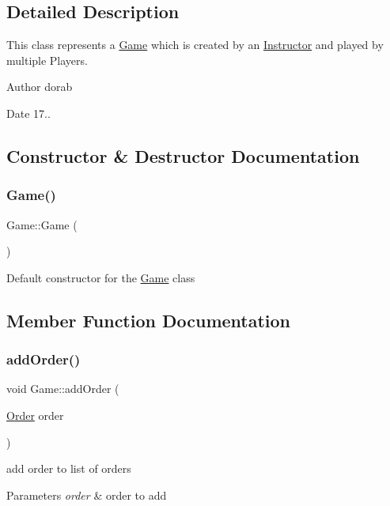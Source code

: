 \subsection{Detailed Description}
This class represents a \hyperlink{classGame}{Game} which is created by an \hyperlink{classInstructor}{Instructor} and played by multiple Players.

\begin{DoxyAuthor}{Author}
dorab 
\end{DoxyAuthor}
\begin{DoxyDate}{Date}
17.. 
\end{DoxyDate}


\subsection{Constructor \& Destructor Documentation}
\mbox{\label{classGame_ad59df6562a58a614fda24622d3715b65}} 
\subsubsection{\texorpdfstring{Game()}{Game()}}
{\footnotesize\ttfamily Game\+::\+Game (\begin{DoxyParamCaption}{ }\end{DoxyParamCaption})}

Default constructor for the \hyperlink{classGame}{Game} class 

\subsection{Member Function Documentation}
\mbox{\label{classGame_a0e6b1f8c9d598c7eb860d04c218fa546}} 
\subsubsection{\texorpdfstring{add\+Order()}{addOrder()}}
{\footnotesize\ttfamily void Game\+::add\+Order (\begin{DoxyParamCaption}\item[{\hyperlink{classOrder}{Order}}]{order }\end{DoxyParamCaption})}

add order to list of orders 
\begin{DoxyParams}{Parameters}
{\em order} & order to add \\
\hline
\end{DoxyParams}
\mbox{\label{classGame_a8471ea91ed18fc2d289eb23747d11d39}} 
